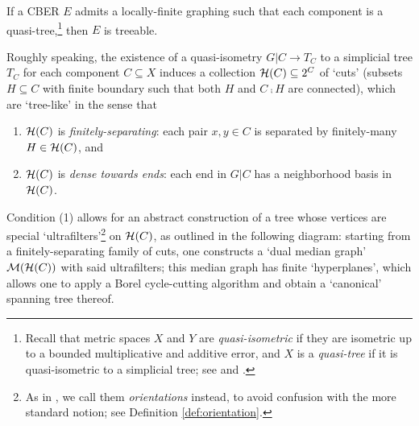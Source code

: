 \documentclass[reqno]{amsart}
\begin{document}
    \begin{mainTheorem}\label{thm:treeing_quasi-trees}
        If a CBER $E$ admits a locally-finite graphing such that each component is a quasi-tree,\footnote{Recall that metric spaces $X$ and $Y$ are \textit{quasi-isometric} if they are isometric up to a bounded multiplicative and additive error, and $X$ is a \textit{quasi-tree} if it is quasi-isometric to a simplicial tree; see \cite{Gro93} and \cite{DK18}.} then $E$ is treeable.
    \end{mainTheorem}

    Roughly speaking, the existence of a quasi-isometry $G|C\to T_C$ to a simplicial tree $T_C$ for each component $C\subseteq X$ induces a collection $\mathcal{H}(C)\subseteq2^C$ of `cuts' (subsets $H\subseteq C$ with finite boundary such that both $H$ and $C\comp H$ are connected), which are `tree-like' in the sense that
    \begin{enumerate}
        \item[1.] $\mathcal{H}(C)$ is \textit{finitely-separating}: each pair $x,y\in C$ is separated by finitely-many $H\in\mathcal{H}(C)$, and
        \item[2.] $\mathcal{H}(C)$ is \textit{dense towards ends}: each end in $G|C$ has a neighborhood basis in $\mathcal{H}(C)$.
    \end{enumerate}
    Condition (1) allows for an abstract construction of a tree whose vertices are special `ultrafilters'\footnote{As in \cite{CPTT23}, we call them \textit{orientations} instead, to avoid confusion with the more standard notion; see Definition \ref{def:orientation}.} on $\mathcal{H}(C)$, as outlined in the following diagram: starting from a finitely-separating family of cuts, one constructs a `dual median graph' $\mathcal{M}(\mathcal{H}(C))$ with said ultrafilters; this median graph has finite `hyperplanes', which allows one to apply a Borel cycle-cutting algorithm and obtain a `canonical' spanning tree thereof.
\end{document}
